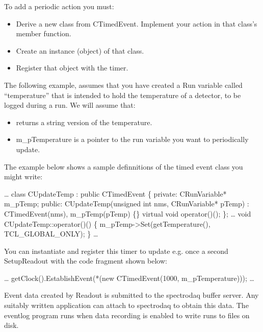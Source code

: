       To add a periodic action you must:
      \begin{itemize}
         \item Derive a new class from CTimedEvent.  Implement your
            action in that class's  member function.
         \item Create an instance (object) of that class.
         \item Register that object with the timer.
      \end{itemize}
   
      The following example, assumes that you have created a Run variable
      called ``temperature'' that is intended to hold the temperature
      of a detector, to be logged during a run. We will assume that:
      \begin{itemize}
         \item {} returns a string version of the
            temperature.
         \item m\_pTemperature is a pointer to the run variable you want
            to periodically update.
      \end{itemize}
      
      The example below shows a sample definnitions of the timed event
      class you might write:
      
      \begin{example}
         \ldots
         class CUpdateTemp : public CTimedEvent
         \{
            private:
                CRunVariable* m\_pTemp;
            public:
               CUpdateTemp(unsigned int nms, CRunVariable* pTemp) :
                  CTimedEvent(nms),
                  m_pTemp(pTemp) \{\}
            virtual void operator()();
         \};
         \ldots
         void
         CUpdateTemp::operator()()
         \{
            m\_pTemp->Set(getTemperature(), TCL\_GLOBAL\_ONLY);
         \}
         \ldots
      \end{example}
      
      You can instantiate and register this timer to update e.g.
      once a second  SetupReadout with
      the code fragment shown below:
      
      \begin{example}
         \ldots
            getClock().EstablishEvent(*(new CTimedEvent(1000, m\_pTemperature)));
         \ldots
      \end{example}
      
   Event data created by Readout is submitted to the spectrodaq buffer 
   server.  Any suitably written application can attach to spectrodaq to
   obtain this data.  The eventlog program runs when data recording is
   enabled to write runs to files on disk.
   
